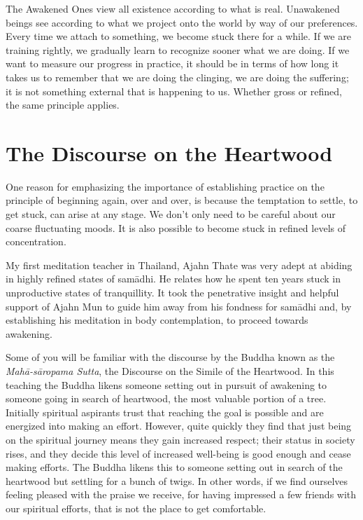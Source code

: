 The Awakened Ones view all existence according to what is real.
Unawakened beings see according to what we project onto the world by way
of our preferences. Every time we attach to something, we become stuck
there for a while. If we are training rightly, we gradually learn to
recognize sooner what we are doing. If we want to measure our progress
in practice, it should be in terms of how long it takes us to remember
that we are doing the clinging, we are doing the suffering; it is not
something external that is happening to us. Whether gross or refined,
the same principle applies.

\section{The Discourse on the Heartwood}

One reason for emphasizing the importance of establishing practice on
the principle of beginning again, over and over, is because the
temptation to settle, to get stuck, can arise at any stage. We don’t
only need to be careful about our coarse fluctuating moods. It is also
possible to become stuck in refined levels of concentration.

My first meditation teacher in Thailand, Ajahn Thate\cite{ajahn-thate}
was very adept
at abiding in highly refined states of samādhi. He relates how he spent
ten years stuck in unproductive states of tranquillity. It took the
penetrative insight and helpful support of Ajahn Mun to guide him away
from his fondness for samādhi and, by establishing his meditation in
body contemplation, to proceed towards awakening.

Some of you will be familiar with the discourse by the Buddha known as
the \emph{Mahā-sāropama Sutta}\cite{mahasaropama-sutta},
the Discourse on the Simile of the Heartwood.
In this teaching the Buddha likens someone setting out in
pursuit of awakening to someone going in search of heartwood, the most
valuable portion of a tree. Initially spiritual aspirants trust that
reaching the goal is possible and are energized into making an effort.
However, quite quickly they find that just being on the spiritual
journey means they gain increased respect; their status in society
rises, and they decide this level of increased well-being is good enough
and cease making efforts. The Buddha likens this to someone setting out
in search of the heartwood but settling for a bunch of twigs. In other
words, if we find ourselves feeling pleased with the praise we receive,
for having impressed a few friends with our spiritual efforts, that is
not the place to get comfortable.

